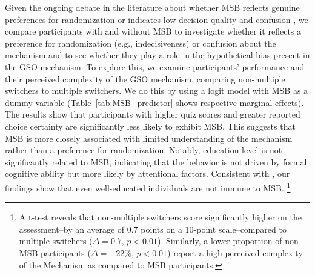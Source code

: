\documentclass[12pt]{article}
\begin{document}
Given the ongoing debate in the literature about whether MSB reflects genuine preferences for randomization \citep{agranov2017stochastic} or indicates low decision quality and confusion \citep{charness2013experimental, yu2021multiple, filippin2016reconsideration}, we compare participants with and without MSB to investigate whether it reflects a preference for randomization (e.g., indecisiveness) or confusion about the mechanism and to see whether they play a role in the hypothetical bias present in the GSO mechanism. To explore this, we examine participants' performance and their perceived complexity of the GSO mechanism, comparing non-multiple switchers to multiple switchers. We do this by using a logit model with MSB as a dummy variable (Table~\ref{tab:MSB_predictor} shows respective marginal effects). The results show that participants with higher quiz scores and greater reported choice certainty are significantly less likely to exhibit MSB. This suggests that MSB is more closely associated with limited understanding of the mechanism rather than  a preference for randomization. Notably, education level is not significantly related to MSB, indicating that the behavior is not driven by formal cognitive ability but more likely by attentional factors. Consistent with \citet{yu2021multiple}, our findings show that even well-educated individuals are not immune to MSB.
\footnote{A t-test reveals that non-multiple switchers score significantly higher on the assessment--by an average of 0.7 points on a 10-point scale--compared to multiple switchers (\(\Delta = 0.7\), \(p < 0.01\)). Similarly, a lower proportion of non-MSB participants (\(\Delta = -22\%\), \(p < 0.01\)) report a high perceived complexity of the Mechanism as compared to MSB participants.} 
\end{document}
